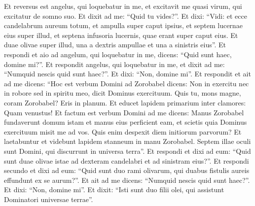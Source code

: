 \begin{biblechapter}
\begin{biblechapter}
\begin{biblechapter}
\begin{biblechapter}
\verse Et reversus est angelus, qui loquebatur in me, et excitavit me quasi virum, qui excitatur de somno suo. 
\verse Et dixit ad me: “Quid tu vides?”. Et dixi: “Vidi: et ecce candelabrum aureum totum, et ampulla super caput ipsius, et septem lucernae eius super illud, et septena infusoria lucernis, quae erant super caput eius. 
\verse Et duae olivae super illud, una a dextris ampullae et una a sinistris eius”.
 \verse Et respondi et aio ad angelum, qui loquebatur in me, dicens: “Quid sunt haec, domine mi?”. 
\verse Et respondit angelus, qui loquebatur in me, et dixit ad me: “Numquid nescis quid sunt haec?”. Et dixi: “Non, domine mi”.
 \verse Et respondit et ait ad me dicens: “Hoc est verbum Domini ad Zorobabel dicens: Non in exercitu nec in robore sed in spiritu meo, dicit Dominus exercituum. 
 \verse Quis tu, mons magne, coram Zorobabel? Eris in planum. Et educet lapidem primarium inter clamores: Quam venustus! 
\verse Et factum est verbum Domini ad me dicens: 
\verse Manus Zorobabel fundaverunt domum istam et manus eius perficient eam, et scietis quia Dominus exercituum misit me ad vos. 
\verse Quis enim despexit diem initiorum parvorum? Et laetabuntur et videbunt lapidem stanneum in manu Zorobabel. Septem illae oculi sunt Domini, qui discurrunt in universa terra”.
 \verse Et respondi et dixi ad eum: “Quid sunt duae olivae istae ad dexteram candelabri et ad sinistram eius?”. 
\verse Et respondi secundo et dixi ad eum: “Quid sunt duo rami olivarum, qui duabus fistulis aureis effundunt ex se aurum?”. 
\verse Et ait ad me dicens: “Numquid nescis quid sunt haec?”. Et dixi: “Non, domine mi”. 
\verse Et dixit: “Isti sunt duo filii olei, qui assistunt Dominatori universae terrae”.
 

\end{biblechapter}
\end{biblechapter}
\end{biblechapter}
\end{biblechapter}
